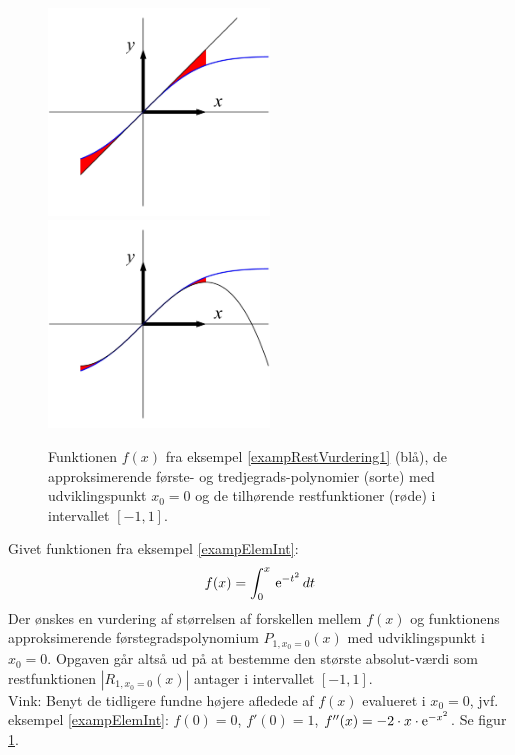 \begin{figure}[ht]
\centerline{ \includegraphics[height=55mm]{plotErf2.pdf} \includegraphics[height=55mm]{plotErf.pdf}}
\begin{center}
\caption{Funktionen $f(x)$ fra eksempel \ref{exampRestVurdering1} (blå), de approksimerende første- og tredjegrads-polynomier (sorte) med udviklingspunkt $x_{0}=0$ og de tilhørende restfunktioner (røde) i intervallet $[-1, 1]$.} \label{figErf}
\end{center}
\end{figure}






\begin{exercise} \label{exampRestVurdering1}
Givet funktionen fra eksempel \ref{exampElemInt}:
\begin{equation}
f(x) = \int_{0}^{x}\,\mathrm{e}^{-t^{2}}\,dt
\end{equation}
Der ønskes en vurdering af størrelsen af forskellen mellem $f(x)$ og funktionens approksimerende førstegradspolynomium $P_{1, x_{0}=0}(x)$ med udviklingspunkt i $x_{0}=0$. Opgaven går altså ud på at bestemme den største absolut-værdi som restfunktionen $|R_{1, x_{0}=0}(x)|$ antager i intervallet $[-1, 1]$.\\
Vink: Benyt de tidligere fundne højere afledede af $f(x)$ evalueret i $x_{0}=0$, jvf. eksempel \ref{exampElemInt}: $f(0)=0$, $f'(0) = 1$, $f''(x)= -2\cdot x \cdot \mathrm{e}^{-x^{2}}$. Se figur \ref{figErf}.
\end{exercise}


